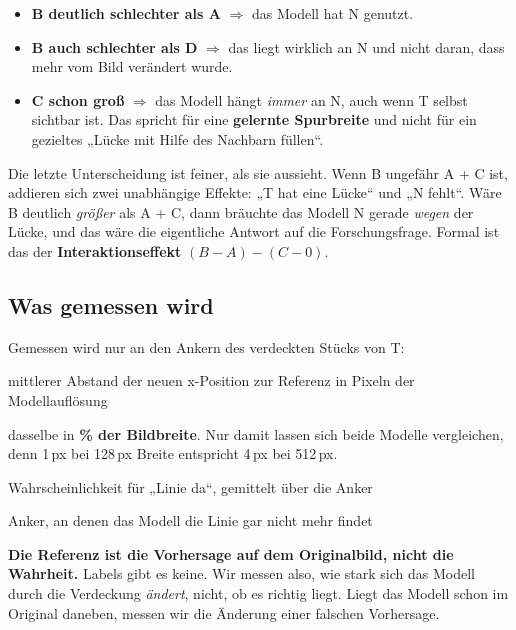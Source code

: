 \documentclass[11pt,a4paper]{article}
\newcommand{\code}[1]{\texttt{#1}}
\begin{document}
\begin{itemize}
  \item \textbf{B deutlich schlechter als A} $\Rightarrow$ das Modell hat N genutzt.
  \item \textbf{B auch schlechter als D} $\Rightarrow$ das liegt wirklich an N und nicht daran,
        dass mehr vom Bild verändert wurde.
  \item \textbf{C schon groß} $\Rightarrow$ das Modell hängt \emph{immer} an N, auch wenn T selbst
        sichtbar ist. Das spricht für eine \textbf{gelernte Spurbreite} und nicht für ein
        gezieltes „Lücke mit Hilfe des Nachbarn füllen“.
\end{itemize}

Die letzte Unterscheidung ist feiner, als sie aussieht. Wenn B ungefähr A + C ist, addieren
sich zwei unabhängige Effekte: „T hat eine Lücke“ und „N fehlt“. Wäre B deutlich \emph{größer}
als A + C, dann bräuchte das Modell N gerade \emph{wegen} der Lücke, und das wäre die
eigentliche Antwort auf die Forschungsfrage. Formal ist das der \textbf{Interaktionseffekt}
$(B - A) - (C - 0)$.

\subsection{Was gemessen wird}

Gemessen wird nur an den Ankern des verdeckten Stücks von T:

\begin{description}[leftmargin=2.9cm, style=nextline]
  \item[\code{dx\_mittel\_px}] mittlerer Abstand der neuen x-Position zur Referenz in Pixeln der
        Modellauflösung
  \item[\code{dx\_mittel\_pct}] dasselbe in \textbf{\% der Bildbreite}. Nur damit lassen sich
        beide Modelle vergleichen, denn 1\,px bei 128\,px Breite entspricht 4\,px bei 512\,px.
  \item[\code{P\_exist\_T}] Wahrscheinlichkeit für „Linie da“, gemittelt über die Anker
  \item[\code{Anker\_verloren}] Anker, an denen das Modell die Linie gar nicht mehr findet
\end{description}

\begin{achtung}
\textbf{Die Referenz ist die Vorhersage auf dem Originalbild, nicht die Wahrheit.} Labels gibt
es keine. Wir messen also, wie stark sich das Modell durch die Verdeckung \emph{ändert}, nicht,
ob es richtig liegt. Liegt das Modell schon im Original daneben, messen wir die Änderung einer
falschen Vorhersage.
\end{achtung}
\end{document}
